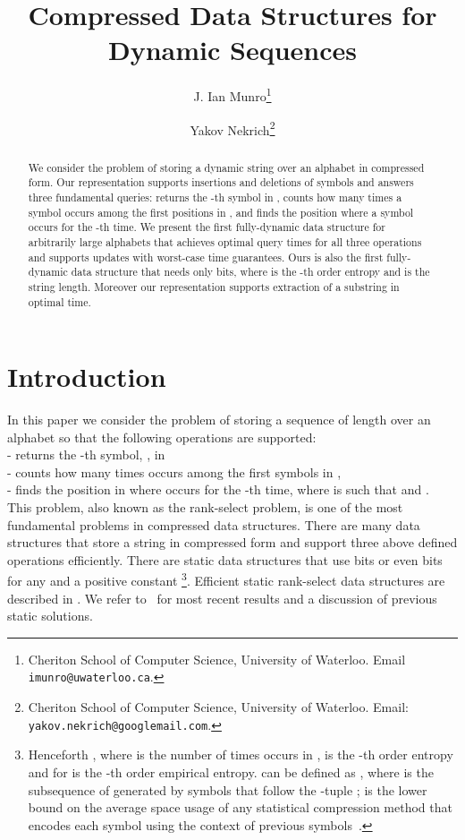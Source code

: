 \documentclass[11pt]{article}\usepackage{fullpage}
\begin{document}
\title{Compressed Data Structures  for  Dynamic Sequences}

\author{
 J. Ian Munro\thanks{Cheriton School of Computer Science, University of Waterloo. Email {\tt imunro@uwaterloo.ca}.}
 \and
 Yakov Nekrich\thanks{Cheriton School of Computer Science, University of Waterloo.
 Email: {\tt yakov.nekrich@googlemail.com}.}
}
\date{}
\maketitle

\begin{abstract}
We consider the problem of storing a dynamic string  over an alphabet  in compressed form. Our representation supports insertions and deletions of symbols and answers three 
fundamental queries:  returns the -th symbol in , 
counts how many times a symbol  occurs among the first  positions in , 
and  finds the position where a symbol  occurs for the -th time. We present the first fully-dynamic data structure for arbitrarily large alphabets that achieves optimal query times for all three operations and supports updates with worst-case time guarantees. Ours is also the first fully-dynamic data structure that needs only  bits, where  is the -th order entropy and  is the string length. 
Moreover our representation supports extraction of a substring  in optimal  time.
\end{abstract}
 

\section{Introduction}
In this paper we consider the problem of storing a sequence  of length  over an alphabet  so that the following operations are supported:\\
-  returns the -th symbol, , in \\
-  counts how many times  occurs among the first  symbols 
in , \\
- finds the position in  where  occurs for the -th time,
 where  is such that   and . \\
This problem, also known as the rank-select problem, is one of the most fundamental problems in compressed data structures. 
There are many  data structures that store a string in compressed form and support three above defined operations efficiently. There are static data structures that use  bits 
or even  bits for any   and a positive constant \footnote{Henceforth , where  is the number of times  occurs in , 
is the -th order entropy and   for  is the -th order empirical entropy.  can be defined as 
, where  is the subsequence of  generated by symbols that follow the -tuple ;  is the lower bound on the average space
usage of any statistical compression method that encodes each symbol using the context of  previous symbols~\cite{Manzini01}.}. Efficient static rank-select data structures are described in \cite{GGV03,GMR06,FMMN07,LP07,LP09,BGNN10,HM10,NS14,BN12}. We refer to~\cite{BN12} for most recent results and a discussion of previous static solutions.
\end{document}
